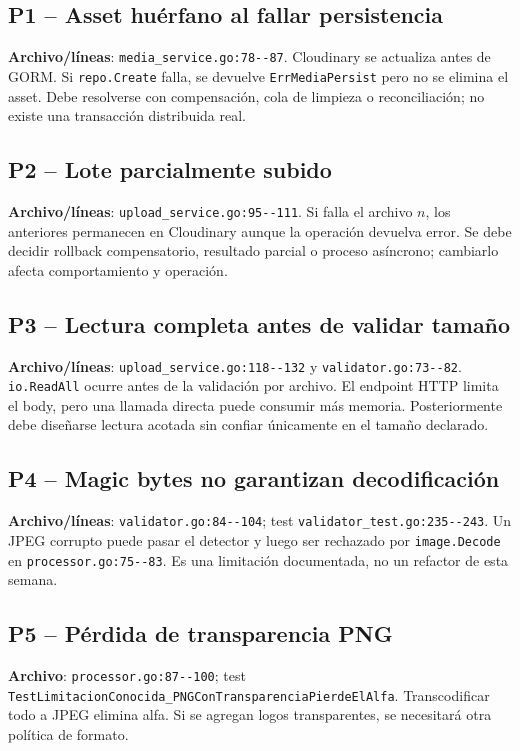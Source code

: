 \documentclass[11pt,a4paper]{article}
\begin{document}
\subsection{P1 -- Asset huérfano al fallar persistencia}
\textbf{Archivo/líneas}: \nolinkurl{media_service.go:78--87}. Cloudinary se actualiza antes de GORM. Si \nolinkurl{repo.Create} falla, se devuelve \nolinkurl{ErrMediaPersist} pero no se elimina el asset. Debe resolverse con compensación, cola de limpieza o reconciliación; no existe una transacción distribuida real.

\subsection{P2 -- Lote parcialmente subido}
\textbf{Archivo/líneas}: \nolinkurl{upload_service.go:95--111}. Si falla el archivo $n$, los anteriores permanecen en Cloudinary aunque la operación devuelva error. Se debe decidir rollback compensatorio, resultado parcial o proceso asíncrono; cambiarlo afecta comportamiento y operación.

\subsection{P3 -- Lectura completa antes de validar tamaño}
\textbf{Archivo/líneas}: \nolinkurl{upload_service.go:118--132} y \nolinkurl{validator.go:73--82}. \nolinkurl{io.ReadAll} ocurre antes de la validación por archivo. El endpoint HTTP limita el body, pero una llamada directa puede consumir más memoria. Posteriormente debe diseñarse lectura acotada sin confiar únicamente en el tamaño declarado.

\subsection{P4 -- Magic bytes no garantizan decodificación}
\textbf{Archivo/líneas}: \nolinkurl{validator.go:84--104}; test \nolinkurl{validator_test.go:235--243}. Un JPEG corrupto puede pasar el detector y luego ser rechazado por \nolinkurl{image.Decode} en \nolinkurl{processor.go:75--83}. Es una limitación documentada, no un refactor de esta semana.

\subsection{P5 -- Pérdida de transparencia PNG}
\textbf{Archivo}: \nolinkurl{processor.go:87--100}; test \nolinkurl{TestLimitacionConocida_PNGConTransparenciaPierdeElAlfa}. Transcodificar todo a JPEG elimina alfa. Si se agregan logos transparentes, se necesitará otra política de formato.
\end{document}
